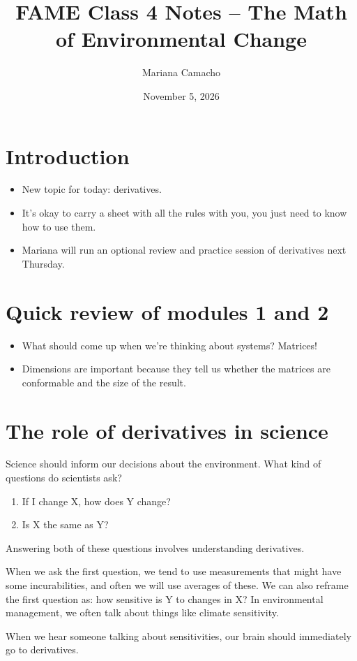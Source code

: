 \documentclass[12pt]{article}
\title{FAME Class 4 Notes -- The Math of Environmental Change}
\author{Mariana Camacho}
\date{November 5, 2026}
\begin{document}
\maketitle
\section{Introduction}
\begin{itemize}
    \item New topic for today: derivatives. 
    \item It's okay to carry a sheet with all the rules with you, you just need to know how to use them. 
    \item Mariana will run an optional review and practice session of derivatives next Thursday. 
\end{itemize}

\section{Quick review of modules 1 and 2}
\begin{itemize}
    \item What should come up when we're thinking about systems? Matrices!
    \item Dimensions are important because they tell us whether the matrices are conformable and the size of the result. 
\end{itemize}

\section{The role of derivatives in science}
Science should inform our decisions about the environment. What kind of questions do scientists ask? 
\begin{enumerate}
    \item If I change X, how does Y change?
    \item Is X the same as Y?
\end{enumerate}
Answering both of these questions involves understanding derivatives.

When we ask the first question, we tend to use measurements that might have some incurabilities, and often we will use averages of these. We can also reframe the first question as: how sensitive is Y to changes in X? In environmental management, we often talk about things like climate sensitivity. 

When we hear someone talking about sensitivities, our brain should immediately go to derivatives. 
\end{document}
